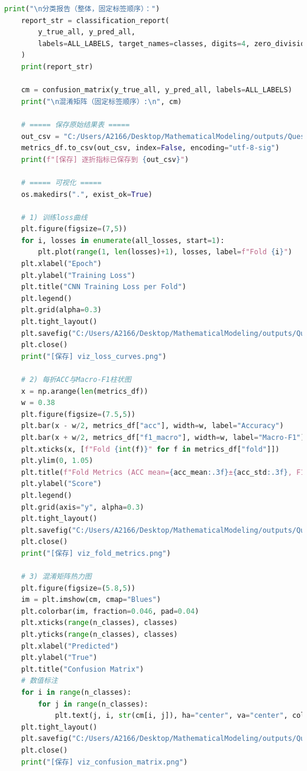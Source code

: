 \documentclass[a4paper]{CPIPC}
\numberwithin{equation}{section}
\begin{document}
\begin{lstlisting}[language=Python, caption=CNN + SVM Classifier]
    print("\n分类报告（整体，固定标签顺序）：")
    report_str = classification_report(
        y_true_all, y_pred_all,
        labels=ALL_LABELS, target_names=classes, digits=4, zero_division=0
    )
    print(report_str)

    cm = confusion_matrix(y_true_all, y_pred_all, labels=ALL_LABELS)
    print("\n混淆矩阵（固定标签顺序）:\n", cm)

    # ===== 保存原始结果表 =====
    out_csv = "C:/Users/A2166/Desktop/MathematicalModeling/outputs/QuestionTwo/results_metrics.csv"
    metrics_df.to_csv(out_csv, index=False, encoding="utf-8-sig")
    print(f"[保存] 逐折指标已保存到 {out_csv}")

    # ===== 可视化 =====
    os.makedirs(".", exist_ok=True)

    # 1) 训练loss曲线
    plt.figure(figsize=(7,5))
    for i, losses in enumerate(all_losses, start=1):
        plt.plot(range(1, len(losses)+1), losses, label=f"Fold {i}")
    plt.xlabel("Epoch")
    plt.ylabel("Training Loss")
    plt.title("CNN Training Loss per Fold")
    plt.legend()
    plt.grid(alpha=0.3)
    plt.tight_layout()
    plt.savefig("C:/Users/A2166/Desktop/MathematicalModeling/outputs/QuestionTwo/viz_loss_curves.png", dpi=160)
    plt.close()
    print("[保存] viz_loss_curves.png")

    # 2) 每折ACC与Macro-F1柱状图
    x = np.arange(len(metrics_df))
    w = 0.38
    plt.figure(figsize=(7.5,5))
    plt.bar(x - w/2, metrics_df["acc"], width=w, label="Accuracy")
    plt.bar(x + w/2, metrics_df["f1_macro"], width=w, label="Macro-F1")
    plt.xticks(x, [f"Fold {int(f)}" for f in metrics_df["fold"]])
    plt.ylim(0, 1.05)
    plt.title(f"Fold Metrics (ACC mean={acc_mean:.3f}±{acc_std:.3f}, F1M mean={f1m_mean:.3f}±{f1m_std:.3f})")
    plt.ylabel("Score")
    plt.legend()
    plt.grid(axis="y", alpha=0.3)
    plt.tight_layout()
    plt.savefig("C:/Users/A2166/Desktop/MathematicalModeling/outputs/QuestionTwo/viz_fold_metrics.png", dpi=160)
    plt.close()
    print("[保存] viz_fold_metrics.png")

    # 3) 混淆矩阵热力图
    plt.figure(figsize=(5.8,5))
    im = plt.imshow(cm, cmap="Blues")
    plt.colorbar(im, fraction=0.046, pad=0.04)
    plt.xticks(range(n_classes), classes)
    plt.yticks(range(n_classes), classes)
    plt.xlabel("Predicted")
    plt.ylabel("True")
    plt.title("Confusion Matrix")
    # 数值标注
    for i in range(n_classes):
        for j in range(n_classes):
            plt.text(j, i, str(cm[i, j]), ha="center", va="center", color="black")
    plt.tight_layout()
    plt.savefig("C:/Users/A2166/Desktop/MathematicalModeling/outputs/QuestionTwo/viz_confusion_matrix.png", dpi=160)
    plt.close()
    print("[保存] viz_confusion_matrix.png")


\end{lstlisting}
\end{document}
